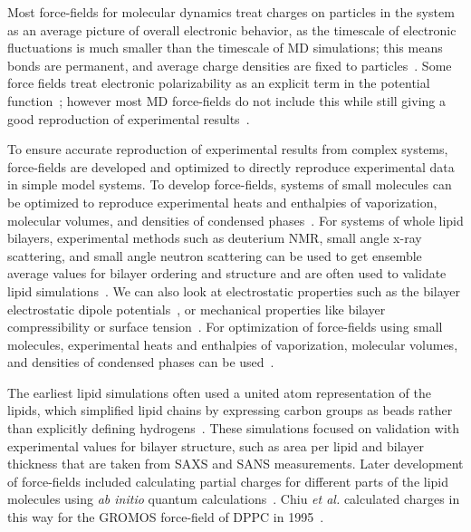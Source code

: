 \documentclass[12pt,openany,final]{book}
\newcommand{\etal}{\textit{et al.}}
\begin{document}
Most force-fields for molecular dynamics treat charges on particles in the system as an average picture of overall electronic behavior, as the
timescale of electronic fluctuations is much smaller than the timescale of MD simulations; this means bonds are permanent,
and average charge densities are fixed to particles~\cite{pandit:2008:simulationtextbook}.
Some force fields treat electronic polarizability as an explicit term in the potential function~\cite{li:2017:drude,ponder:2010:current}; however
most MD force-fields do not include this while still giving a good reproduction of experimental results~\cite{pandit:2008:simulationtextbook,chiu:2009,leonard:2018}.

To ensure accurate reproduction of experimental results from complex systems, 
force-fields are developed and optimized to directly reproduce experimental data
in simple model systems. To develop force-fields, systems of small molecules can be 
optimized to reproduce experimental heats and enthalpies of 
vaporization, molecular volumes, 
and densities of condensed phases~\cite{berger:1997,chiu:1999:optimization,chiu:2003:structure,chiu:2009}.
For systems of whole lipid bilayers, experimental methods such as deuterium NMR, small angle x-ray scattering, and small angle neutron scattering 
can be used to get ensemble average values for bilayer ordering and structure and are often used to 
validate lipid simulations~\cite{pandit:2008:simulationtextbook,fogarty:2015,chiu:2009,kruczek:2017:ether,kruczek:2017,leonard:2018,li:2017:drude,nagle:2000}.
We can also look at electrostatic properties such as the bilayer electrostatic dipole potentials~\cite{gawrisch:1992,berkowitz:2006:aqueous}, or mechanical
properties like bilayer compressibility or surface tension~\cite{kruczek:2017:ether,kruczek:2017,jahnig:1996:surface}.
For optimization of force-fields using small molecules, experimental heats and enthalpies of vaporization, molecular volumes, 
and densities of condensed phases can be used~\cite{berger:1997,chiu:1999:optimization,chiu:2003:structure,chiu:2009}.

The earliest lipid simulations often used a united atom representation of the lipids, which simplified lipid chains by expressing carbon groups
as beads rather than explicitly defining hydrogens~\cite{raghavan:1992,marrink:1993,egberts:1994}. These simulations focused on validation with experimental
values for bilayer structure, such as area per lipid and bilayer thickness that are taken from SAXS and SANS measurements. 
Later development of force-fields included calculating partial charges
for different parts of the lipid molecules using \emph{ab initio} quantum calculations~\cite{chiu:1995:incorporation,marrink:1993}. Chiu \etal
calculated charges in this way for the GROMOS force-field of DPPC in 1995~\cite{chiu:1995:incorporation}.
\end{document}
